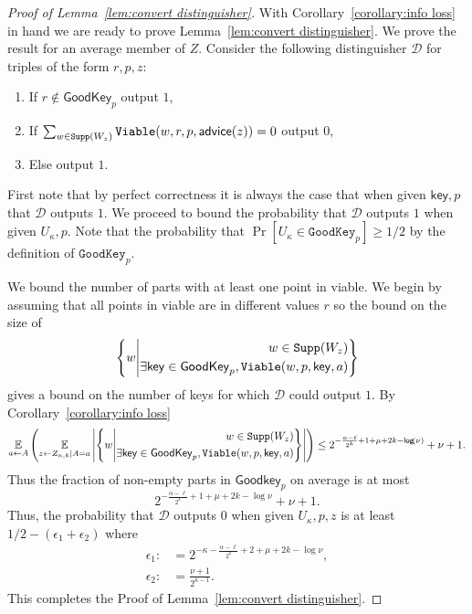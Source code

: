 \begin{proof}[Proof of Lemma~\ref{lem:convert distinguisher}]
\noindent
With Corollary~\ref{corollary:info loss} in hand we are ready to prove Lemma~\ref{lem:convert distinguisher}.
We prove the result for an average member of $Z$.
Consider the following distinguisher $\mathcal{D}$ for triples of the form $r, p, z$:
\begin{enumerate}
\item If $r \not\in \mathsf{GoodKey}_p$ output $1$,
\item If $\sum_{w\in\mathtt{Supp}(W_z)} \mathtt{Viable}(w, r, p, {\mathsf{advice}}(z)) =0 $ output $0$,
\item Else output $1$.
\end{enumerate}
First note that by perfect correctness it is always the case that when given $\mathsf{key}, p$ that $\mathcal{D}$ outputs $1$.  We proceed to bound the probability that $\mathcal{D}$ outputs $1$ when given $U_\kappa, p$.  Note that the probability that $\Pr[U_\kappa \in \mathtt{GoodKey}_p] \ge 1/2$ by the definition of $\mathtt{GoodKey}_p$. 

We bound the number of parts with at least one point in viable.  We begin by assuming that all points in viable are in different  values $r$ so the bound on the size of 
\[
\left\{ 
w\middle| \begin{aligned}w\in \mathtt{Supp}(W_z)\\\exists \mathsf{key}\in\mathsf{GoodKey}_p, \mathtt{Viable}(w,p,\mathsf{key},a)\end{aligned} \right\}\]
gives a bound on the number of keys for which $\mathcal{D}$ could output $1$. By Corollary~\ref{corollary:info loss} 
\[
\operatorname*{\mathbb{E}}_{a\leftarrow A}\left(\operatorname*{\mathbb{E}}_{z\leftarrow Z_{n,k}| A=a} \left|\left\{ 
w\middle| \begin{aligned}w\in \mathtt{Supp}(W_z)\\\exists \mathsf{key}\in\mathsf{GoodKey}_p, \mathtt{Viable}(w,p,\mathsf{key},a)\end{aligned} \right\} \right| \right)\le 2^{-\frac{\alpha-\ell}{2^k}+1+\mu+2k-\mathsf{log}\!\left(\nu\right)}+\nu+1.
\]
Thus the fraction of non-empty parts in $\mathsf{Goodkey}_p$ on average is at most 
\[
2^{-\frac{\alpha-\ell}{2^k}+1+\mu+2k-\log{\nu}}+\nu+1.
\]
Thus, the probability that $\mathcal{D}$ outputs $0$ when given $U_\kappa, p, z$ is at least 
$1/2-(\epsilon_1+\epsilon_2)$
where 
\begin{align*}
\epsilon_1:&=2^{-\kappa-\frac{\alpha-\ell}{2^k}+2+\mu+2k-\log{\nu}},\\
\epsilon_2:&=\frac{\nu+1}{2^{\kappa-1}}.
\end{align*}
\noindent
This completes the Proof of Lemma~\ref{lem:convert distinguisher}.
\end{proof}

